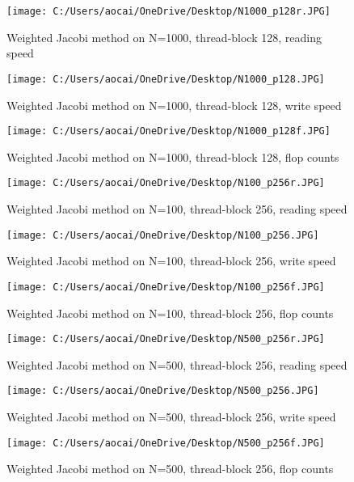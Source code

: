 \documentclass[12pt]{article}
\begin{document}
\begin{figure}[H]
	\centering
	\texttt{[image: C:/Users/aocai/OneDrive/Desktop/N1000\_p128r.JPG]}
	\caption[Optional caption]{Weighted Jacobi method on N=1000, thread-block 128, reading speed}
	\label{fig:N1000_p128r}
\end{figure}
\begin{figure}[H]
	\centering
	\texttt{[image: C:/Users/aocai/OneDrive/Desktop/N1000\_p128.JPG]}
	\caption[Optional caption]{Weighted Jacobi method on N=1000, thread-block 128, write speed}
	\label{fig:N1000_p128w}
\end{figure}
\begin{figure}[H]
	\centering
	\texttt{[image: C:/Users/aocai/OneDrive/Desktop/N1000\_p128f.JPG]}
	\caption[Optional caption]{Weighted Jacobi method on N=1000, thread-block 128, flop counts}
	\label{fig:N1000_p128f}
\end{figure}
\begin{figure}[H]
	\centering
	\texttt{[image: C:/Users/aocai/OneDrive/Desktop/N100\_p256r.JPG]}
	\caption[Optional caption]{Weighted Jacobi method on N=100, thread-block 256, reading speed}
	\label{fig:N100_p256r}
\end{figure}
\begin{figure}[H]
	\centering
	\texttt{[image: C:/Users/aocai/OneDrive/Desktop/N100\_p256.JPG]}
	\caption[Optional caption]{Weighted Jacobi method on N=100, thread-block 256, write speed}
	\label{fig:N100_p256w}
\end{figure}
\begin{figure}[H]
	\centering
	\texttt{[image: C:/Users/aocai/OneDrive/Desktop/N100\_p256f.JPG]}
	\caption[Optional caption]{Weighted Jacobi method on N=100, thread-block 256, flop counts}
	\label{fig:N100_p256f}
\end{figure}
\begin{figure}[H]
	\centering
	\texttt{[image: C:/Users/aocai/OneDrive/Desktop/N500\_p256r.JPG]}
	\caption[Optional caption]{Weighted Jacobi method on N=500, thread-block 256, reading speed}
	\label{fig:N500_p256r}
\end{figure}
\begin{figure}[H]
	\centering
	\texttt{[image: C:/Users/aocai/OneDrive/Desktop/N500\_p256.JPG]}
	\caption[Optional caption]{Weighted Jacobi method on N=500, thread-block 256, write speed}
	\label{fig:N500_p256w}
\end{figure}
\begin{figure}[H]
	\centering
	\texttt{[image: C:/Users/aocai/OneDrive/Desktop/N500\_p256f.JPG]}
	\caption[Optional caption]{Weighted Jacobi method on N=500, thread-block 256, flop counts}
	\label{fig:N500_p256f}
\end{figure}
\end{document}
